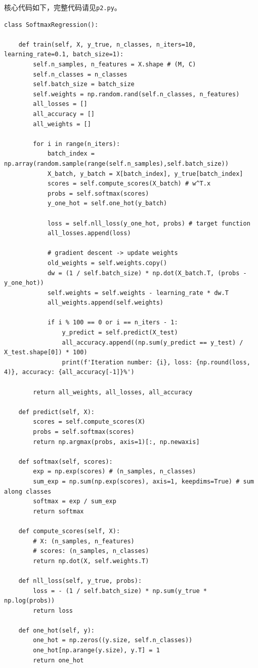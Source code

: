 \documentclass[logo,reportComp]{thesis}
\begin{document}
核心代码如下，完整代码请见\verb'p2.py'。
\begin{lstlisting}
class SoftmaxRegression():

	def train(self, X, y_true, n_classes, n_iters=10, learning_rate=0.1, batch_size=1):
		self.n_samples, n_features = X.shape # (M, C)
		self.n_classes = n_classes
		self.batch_size = batch_size
		self.weights = np.random.rand(self.n_classes, n_features)
		all_losses = []
		all_accuracy = []
		all_weights = []
		
		for i in range(n_iters):
			batch_index = np.array(random.sample(range(self.n_samples),self.batch_size))
			X_batch, y_batch = X[batch_index], y_true[batch_index]
			scores = self.compute_scores(X_batch) # w^T.x
			probs = self.softmax(scores)
			y_one_hot = self.one_hot(y_batch)

			loss = self.nll_loss(y_one_hot, probs) # target function
			all_losses.append(loss)

			# gradient descent -> update weights
			old_weights = self.weights.copy()
			dw = (1 / self.batch_size) * np.dot(X_batch.T, (probs - y_one_hot))
			self.weights = self.weights - learning_rate * dw.T
			all_weights.append(self.weights)

			if i % 100 == 0 or i == n_iters - 1:
				y_predict = self.predict(X_test)
				all_accuracy.append((np.sum(y_predict == y_test) / X_test.shape[0]) * 100)
				print(f'Iteration number: {i}, loss: {np.round(loss, 4)}, accuracy: {all_accuracy[-1]}%')

		return all_weights, all_losses, all_accuracy

	def predict(self, X):
		scores = self.compute_scores(X)
		probs = self.softmax(scores)
		return np.argmax(probs, axis=1)[:, np.newaxis]

	def softmax(self, scores):
		exp = np.exp(scores) # (n_samples, n_classes)
		sum_exp = np.sum(np.exp(scores), axis=1, keepdims=True) # sum along classes
		softmax = exp / sum_exp
		return softmax

	def compute_scores(self, X):
		# X: (n_samples, n_features)
		# scores: (n_samples, n_classes)
		return np.dot(X, self.weights.T)

	def nll_loss(self, y_true, probs):
		loss = - (1 / self.batch_size) * np.sum(y_true * np.log(probs))
		return loss

	def one_hot(self, y):
		one_hot = np.zeros((y.size, self.n_classes))
		one_hot[np.arange(y.size), y.T] = 1
		return one_hot
\end{lstlisting}
\end{document}
